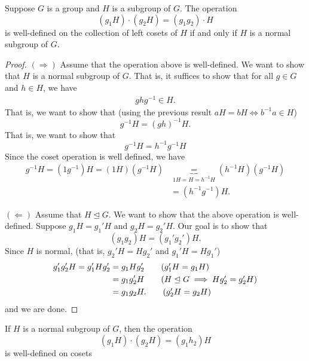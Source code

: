 \begin{theorem}[ ]
    Suppose \( G  \) is a group and \( H  \) is a subgroup of \( G  \). The operation 
    \[  ({g}_{1}H) \cdot ({g}_{2}H) = ({g}_{1}{g}_{2}) \cdot H \]
    is well-defined on the collection of left cosets of \( H  \) if and only if \( H  \) is a normal subgroup of \( G  \).
\end{theorem}
\begin{proof}
\( (\Longrightarrow) \) Assume that the operation above is well-defined. We want to show that \( H  \) is a normal subgroup of \( G  \). That is, it suffices to show that for all \( g \in G  \) and \( h \in H  \), we have 
\begin{align*}
    g h g^{-1 } \in H. 
\end{align*}
That is, we want to show that (using the previous result \( aH = b H  \iff b^{-1} a \in H  \)) 
\[  g^{-1} H  = (gh)^{-1} H.  \]
That is, we want to show that 
\[  g^{-1} H = h^{-1} g^{-1} H  \tag{*} \]
Since the coset operation is well defined, we have
\begin{align*}
    g^{-1} H = (1 g^{-1}) H  = (1H) (g^{-1}H) &\underbrace{=}_{1 H  = H = h^{-1} H} (h^{-1} H) (g^{-1} H )  \\
                                              &= (h^{-1} g^{-1})H.
\end{align*}

\( (\Longleftarrow) \) Assume that \( H \trianglelefteq G  \). We want to show that the above operation is well-defined. Suppose \( {g}_{1} H = {g}_{1}' H   \) and \( {g}_{2} H = {g}_{2}'  H \). Our goal is to show that
\[ ({g}_{1}{g}_{2})H = ({g}_{1}' {g}_{2}') H. \tag{*}  \]
Since \( H  \) is normal, (that is, \( {g}_{2}' H = H {g}_{2}' \) and \( {g}_{1}' H  = H {g}_{1}' \))
\begin{align*}
    {g}_{1}' {g}_{2}' H  = {g}_{1}' H {g}_{2}' &= {g}_{1} H {g}_{2}' \tag{\( {g}_{1}' H = {g}_{1} H  \)} \\
                                               &= {g}_{1} {g}_{2}'  H \tag{\( H \trianglelefteq G \implies H {g}_{2}' = {g}_{2}' H  \)} \\
                                               &= {g}_{1} {g}_{2} H. \tag{\( {g}_{2}' H = {g}_{2} H  \)}
\end{align*}
and we are done.
\end{proof}

\begin{theorem}
    If \( H  \) is a normal subgroup of \( G  \), then the operation 
    \[  ({g}_{1}H) \cdot ({g}_{2}H ) = ({g}_{1}{h}_{2}) H  \]
    is well-defined on cosets 
\end{theorem}

